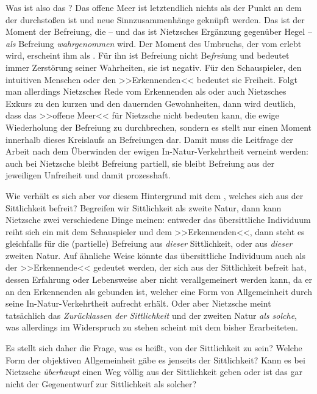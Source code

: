 \documentclass[12pt, a4paper, openany]{report}
\begin{document}
Was ist also das ?
Das offene Meer ist letztendlich nichts als der Punkt an dem der  durchstoßen ist und neue Sinnzusammenhänge geknüpft werden. 
Das  ist der Moment der Befreiung, die -- und das ist Nietzsches Ergänzung gegenüber Hegel -- \emph{als} Befreiung \emph{wahrgenommen} wird.
Der Moment des Umbruchs, der vom  erlebt wird, erscheint ihm als .
Für ihn ist Befreiung nicht Be\-\emph{frei}\-ung und bedeutet immer Zerstörung seiner Wahrheiten, sie ist negativ. 
Für den Schauspieler, den intuitiven Menschen oder den >>Erkennenden<< bedeutet sie Freiheit.
Folgt man allerdings Nietzsches Rede vom Erkennenden als  oder auch Nietzsches Exkurs zu den kurzen und den dauernden Gewohnheiten, dann wird deutlich, dass das >>offene Meer<< für Nietzsche nicht bedeuten kann, die ewige Wiederholung der Befreiung zu durchbrechen, sondern es stellt nur einen Moment innerhalb dieses Kreislaufs an Befreiungen dar. 
Damit muss die Leitfrage der Arbeit nach dem Überwinden der ewigen In-Natur-Verkehrtheit verneint werden:
auch bei Nietzsche bleibt Befreiung partiell, sie bleibt Befreiung aus der jeweiligen Unfreiheit und damit prozesshaft.

Wie verhält es sich aber vor diesem Hintergrund mit dem , welches sich aus der Sittlichkeit befreit? 
Begreifen wir Sittlichkeit als zweite Natur, dann kann Nietzsche zwei verschiedene Dinge meinen: 
entweder das übersittliche Individuum reiht sich ein mit dem Schauspieler und dem >>Erkennenden<<, dann steht es gleichfalls für die (partielle) Befreiung aus \emph{dieser} Sittlichkeit, oder aus \emph{dieser} zweiten Natur. 
Auf ähnliche Weise könnte das übersittliche Individuum auch als der >>Erkennende<< gedeutet werden, der sich aus der Sittlichkeit befreit hat, dessen Erfahrung oder Lebensweise aber nicht verallgemeinert werden kann, da er an den Erkennenden als  gebunden ist, welcher eine Form von Allgemeinheit durch seine In-Natur-Verkehrtheit aufrecht erhält.
Oder aber Nietzsche meint tatsächlich das \emph{Zurücklassen der Sittlichkeit} und der zweiten Natur \emph{als solche}, was allerdings im Widerspruch zu stehen scheint mit dem bisher Erarbeiteten.

Es stellt sich daher die Frage, was es heißt, von der Sittlichkeit  zu sein? 
Welche Form der objektiven Allgemeinheit gäbe es jenseits der Sittlichkeit?
Kann es bei Nietzsche \emph{überhaupt} einen Weg völlig aus der Sittlichkeit geben oder ist das  gar nicht der Gegenentwurf zur Sittlichkeit als solcher? 
\end{document}
